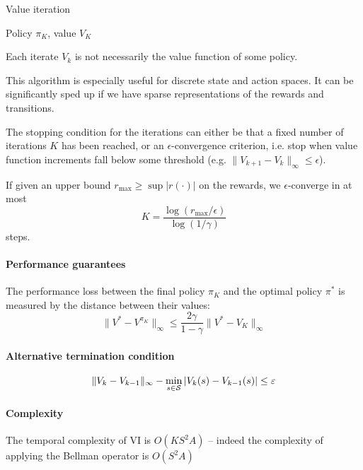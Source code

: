 \documentclass[../course-notes.tex]{subfiles}
\begin{document}
\begin{algorithm}
	\caption{Value iteration}
	\Return Policy $\pi_K$, value $V_K$\;
\end{algorithm}

\begin{remark}
Each iterate $V_k$ is not necessarily the value function of some policy.
\end{remark}

This algorithm is especially useful for discrete state and action spaces. It can be significantly sped up if we have sparse representations of the rewards and transitions.

The stopping condition for the iterations can either be that a fixed number of iterations $K$ has been reached, or an $\epsilon$-convergence criterion, i.e. stop when value function increments fall below some threshold (e.g. $\|V_{k+1} - V_k\|_{\infty} \leq \epsilon$).

\begin{prop}
	If given an upper bound $r_{\max{}} \geq \sup |r(\cdot)|$ on the rewards, we $\epsilon$-converge in at most
	\[
		K = \frac{\log(r_{\max{}}/\epsilon)}{\log(1/\gamma)}
	\]
	steps.
\end{prop}

\paragraph{Performance guarantees} The performance loss between the final policy $\pi_K$ and the optimal policy $\pi^*$ is measured by the distance between their values:
\[
	\|V^* - V^{\pi_K}\|_\infty \leq
	\frac{2\gamma}{1 - \gamma} \| V^* - V_K\|_\infty
\]

\paragraph{Alternative termination condition}
\[
	\|V_k-V_{k-1}\|_\infty -
	\min_{s\in\mathcal{S}} |V_k(s) - V_{k-1}(s)| \leq \varepsilon
\]

\paragraph{Complexity} The temporal complexity of VI is $O(KS^2A)$ -- indeed the complexity of applying the Bellman operator is $O(S^2A)$
\end{document}
